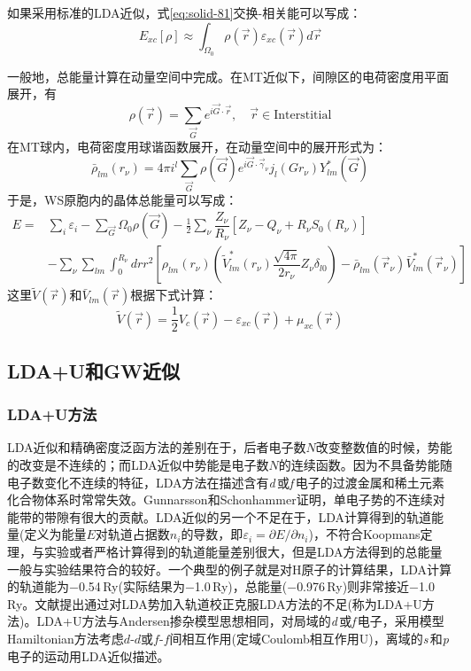 如果采用标准的LDA近似，式\eqref{eq:solid-81}交换-相关能可以写成：
\begin{equation}
  E_{xc}[\rho]\approx\int_{\Omega_0}\rho(\vec r)\varepsilon_{xc}(\vec r)d\vec r
  \label{eq:solid-82}
\end{equation}

一般地，总能量计算在动量空间中完成。在MT近似下，间隙区的电荷密度用平面展开，有
$$\rho(\vec r)=\sum_{\vec G}e^{i\vec G\cdot\vec r},\quad \vec r\in\mathrm{Interstitial}$$
在MT球内，电荷密度用球谐函数展开，在动量空间中的展开形式为：
$$\bar\rho_{lm}(r_{\nu})=4\pi i^l\sum_{\vec G}\rho(\vec G)e^{i\vec G\cdot\vec{\gamma}_{\nu}}j_l(Gr_{\nu})Y_{lm}^{\ast}(\vec G)$$
于是，WS原胞内的晶体总能量可以写成：
\begin{equation}
  \begin{split}
  E=&\sum_i\varepsilon_i-\sum_{\vec G}\Omega_0\rho(\vec G)-\frac12\sum_{\nu}\dfrac{Z_{\nu}}{R_{\nu}}[Z_{\nu}-Q_{\nu}+R_{\nu}S_0(R_{\nu})]\\
  &-\sum_{\nu}\sum_{lm}\int_0^{R_{\nu}}drr^2\left[\rho_{lm}(r_{\nu})\left(\tilde V_{lm}^{\ast}(r_{\nu})\dfrac{\sqrt{4\pi}}{2r_{\nu}}Z_{\nu}\delta_{l0}\right)-\bar\rho_{lm}(\vec r_{\nu})\bar V_{lm}^{\ast}(\vec r_{\nu})\right]
  \end{split}
  \label{eq:solid-83}
\end{equation}
这里$\tilde V(\vec r)$和$\bar V_{lm}(\vec r)$根据下式计算：
$$\tilde V(\vec r)=\frac12V_c(\vec r)-\varepsilon_{xc}(\vec r)+\mu_{xc}(\vec r)$$

\subsection{LDA+U和GW近似}

\subsubsection{LDA+U方法}
LDA近似和精确密度泛函方法的差别在于，后者电子数$N$改变整数值\cite{PRL49-1691_1982}的时候，势能的改变是不连续的；而LDA近似中势能是电子数$N$的连续函数。因为不具备势能随电子数变化不连续的特征，LDA方法在描述含有{\it d}\,或{\it f}\,电子的过渡金属和稀土元素化合物体系时常常失效。Gunnarsson和Schonhammer\cite{PRL56-1968_1986}证明，单电子势的不连续对能带的带隙有很大的贡献。LDA近似的另一个不足在于，LDA计算得到的轨道能量(定义为能量$E$对轨道占据数$n_i$的导数，即$\varepsilon_i=\partial E/\partial n_i$)，不符合Koopmans定理，与实验或者严格计算得到的轨道能量差别很大，但是LDA方法得到的总能量一般与实验结果符合的较好。一个典型的例子就是对H原子的计算结果，LDA计算的轨道能为$-$0.54\,Ry(实际结果为$-$1.0\,Ry)，总能量($-$0.976\,Ry)则非常接近$-$1.0\,Ry\cite{PRB37-9919_1988}。文献\cite{PRB44-943_1991}提出通过对LDA势加入轨道校正克服LDA方法的不足(称为LDA+U方法)。LDA+U方法与Andersen掺杂模型\cite{PR124-41_1961}思想相同，对局域的{\it d}\,或{\it f}\,电子，采用模型Hamiltonian方法考虑$d$-$d$或$f$-$f$间相互作用(定域Coulomb相互作用U)，离域的{\it s}\,和{\it p}\,电子的运动用LDA近似描述。

